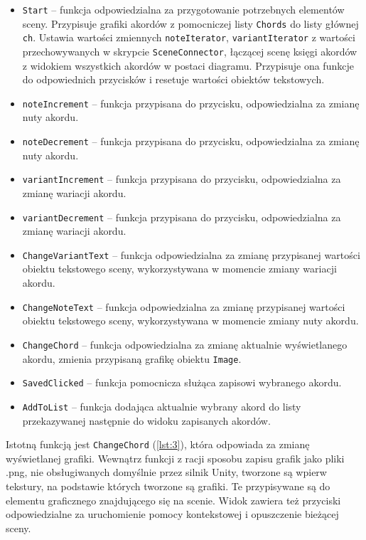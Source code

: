 \begin{itemize}
    \item \texttt{Start} -- funkcja odpowiedzialna za przygotowanie potrzebnych elementów sceny. Przypisuje grafiki akordów z pomocniczej listy \texttt{Chords} do listy głównej \texttt{ch}. Ustawia wartości zmiennych \texttt{noteIterator}, \texttt{variantIterator} z wartości przechowywanych w skrypcie \texttt{SceneConnector}, łączącej scenę księgi akordów z widokiem wszystkich akordów w postaci diagramu. Przypisuje ona funkcje do odpowiednich przycisków i resetuje wartości obiektów tekstowych.
    \item \texttt{noteIncrement} -- funkcja przypisana do przycisku, odpowiedzialna za zmianę nuty akordu.
    \item \texttt{noteDecrement} -- funkcja przypisana do przycisku, odpowiedzialna za zmianę nuty akordu.
    \item \texttt{variantIncrement} -- funkcja przypisana do przycisku, odpowiedzialna za zmianę wariacji akordu.
    \item \texttt{variantDecrement} -- funkcja przypisana do przycisku, odpowiedzialna za zmianę wariacji akordu.
    \item \texttt{ChangeVariantText} -- funkcja odpowiedzialna za zmianę przypisanej wartości obiektu tekstowego sceny, wykorzystywana w momencie zmiany wariacji akordu.
    \item \texttt{ChangeNoteText} -- funkcja odpowiedzialna za zmianę przypisanej wartości obiektu tekstowego sceny, wykorzystywana w momencie zmiany nuty akordu.
    \item \texttt{ChangeChord} -- funkcja odpowiedzialna za zmianę aktualnie wyświetlanego akordu, zmienia przypisaną grafikę obiektu \texttt{Image}.
    \item \texttt{SavedClicked} -- funkcja pomocnicza służąca zapisowi wybranego akordu.
    \item \texttt{AddToList} -- funkcja dodająca aktualnie wybrany akord do listy przekazywanej następnie do widoku zapisanych akordów.
\end{itemize}

Istotną funkcją jest \texttt{ChangeChord} (\ref{lst:3}), która odpowiada za zmianę wyświetlanej grafiki. Wewnątrz funkcji z racji sposobu zapisu grafik jako pliki .png, nie obsługiwanych domyślnie przez silnik Unity, tworzone są wpierw tekstury, na podstawie których tworzone są grafiki. Te przypisywane są do elementu graficznego znajdującego się na scenie. Widok zawiera też przyciski odpowiedzialne za uruchomienie pomocy kontekstowej i opuszczenie bieżącej sceny.

